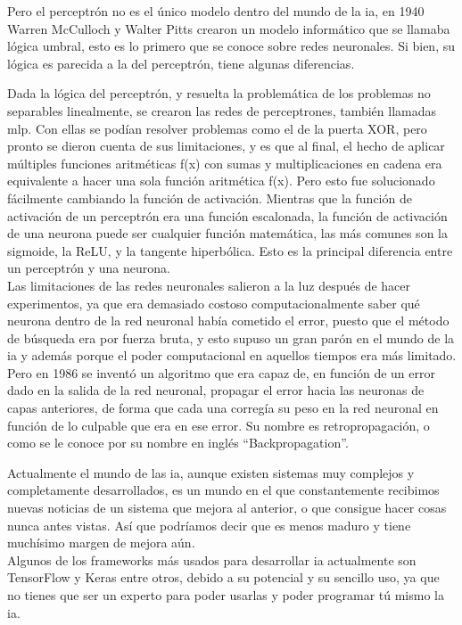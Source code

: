 Pero el perceptrón no es el único modelo dentro del mundo de la \gls{ia}, en 1940 Warren McCulloch y Walter Pitts crearon un modelo informático que se llamaba lógica umbral, esto es lo primero que se conoce sobre redes neuronales. Si bien, su lógica es parecida a la del perceptrón, tiene algunas diferencias. 

Dada la lógica del perceptrón, y resuelta la problemática de los problemas no separables linealmente, se crearon las redes de perceptrones, también llamadas \gls{mlp}. Con ellas se podían resolver problemas como el de la puerta XOR, pero pronto se dieron cuenta de sus limitaciones, y es que al final, el hecho de aplicar múltiples funciones aritméticas f(x) con sumas y multiplicaciones en cadena era equivalente a hacer una sola función aritmética f(x). Pero esto fue solucionado fácilmente cambiando la función de activación. Mientras que la función de activación de un perceptrón era una función escalonada, la función de activación de una neurona puede ser cualquier función matemática, las más comunes son la sigmoide, la ReLU, y la tangente hiperbólica. Esto es la principal diferencia entre un perceptrón y una neurona.
\\
Las limitaciones de las redes neuronales salieron a la luz después de hacer experimentos, ya que era demasiado costoso computacionalmente saber qué neurona dentro de la red neuronal había cometido el error, puesto que el método de búsqueda era por fuerza bruta, y esto supuso un gran parón en el mundo de la \gls{ia} y además porque el poder computacional en aquellos tiempos era más limitado.
\\
Pero en 1986 se inventó un algoritmo que era capaz de, en función de un error dado en la salida de la red neuronal, propagar el error hacia las neuronas de capas anteriores, de forma que cada una corregía su peso en la red neuronal en función de lo culpable que era en ese error. Su nombre es retropropagación, o como se le conoce por su nombre en inglés ``Backpropagation''. 

Actualmente el mundo de las \gls{ia}, aunque existen sistemas muy complejos y completamente desarrollados, es un mundo en el que constantemente recibimos nuevas noticias de un sistema que mejora al anterior, o que consigue hacer cosas nunca antes vistas. Así que podríamos decir que es menos maduro y tiene muchísimo margen de mejora aún.
\\
Algunos de los frameworks más usados para desarrollar \gls{ia} actualmente son TensorFlow y Keras entre otros, debido a su potencial y su sencillo uso, ya que no tienes que ser un experto para poder usarlas y poder programar tú mismo la \gls{ia}.

